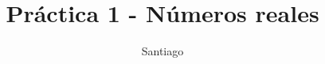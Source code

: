 \documentclass{article}
\title{Práctica 1 - Números reales}
\author{Santiago}
\date{}
\begin{document}
    \maketitle
    \begin{enumerate}
        
    \end{enumerate}
\end{document}
